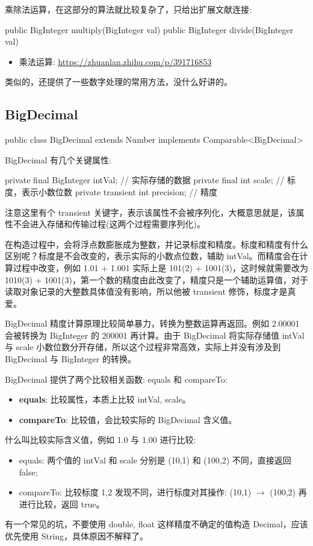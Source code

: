 乘除法运算，在这部分的算法就比较复杂了，只给出扩展文献连接:
\begin{Java}
public BigInteger multiply(BigInteger val)
public BigInteger divide(BigInteger val)
\end{Java}

\begin{itemize}
    \item 乘法运算: \url{https://zhuanlan.zhihu.com/p/391716853}
\end{itemize}

类似的，还提供了一些数字处理的常用方法，没什么好讲的。

\subsection{BigDecimal }

\begin{Java}
public class BigDecimal extends Number implements Comparable<BigDecimal>
\end{Java}

BigDecimal 有几个关键属性:

\begin{Java}
private final BigInteger intVal;    // 实际存储的数据
private final int scale;            // 标度，表示小数位数
private transient int precision;    // 精度
\end{Java}

注意这里有个 transient 关键字，表示该属性不会被序列化，大概意思就是，该属性不会进入存储和传输过程(这两个过程需要序列化)。

在构造过程中，会将浮点数膨胀成为整数，并记录标度和精度。标度和精度有什么区别呢？标度是不会改变的，表示实际的小数点位数，辅助 intVal。而精度会在计算过程中改变，例如 1.01 + 1.001 实际上是 101(2) + 1001(3)，这时候就需要改为 1010(3) + 1001(3)，第一个数的精度由此改变了，精度只是一个辅助运算值，对于读取对象记录的大整数具体值没有影响，所以他被 transient 修饰，标度才是真爱。

BigDecimal 精度计算原理比较简单暴力，转换为整数运算再返回。例如 2.00001 会被转换为 BigInteger 的 200001 再计算。由于 BigDecimal 将实际存储值 intVal 与 scale 小数位数分开存储，所以这个过程非常高效，实际上并没有涉及到 BigDecimal 与 BigInteger 的转换。

BigDecimal 提供了两个比较相关函数: equals 和 compareTo:
\begin{itemize}
    \item \textbf{equals}: 比较属性，本质上比较 intVal, scale。
    \item \textbf{compareTo}: 比较值，会比较实际的 BigDecimal 含义值。
\end{itemize}

什么叫比较实际含义值，例如 1.0 与 1.00 进行比较:
\begin{itemize}
    \item equals: 两个值的 intVal 和 scale 分别是 (10,1) 和 (100,2) 不同，直接返回 false;
    \item compareTo: 比较标度 1,2 发现不同，进行标度对其操作: (10,1) $\rightarrow$ (100,2) 再进行比较，返回 true。
\end{itemize}

有一个常见的坑，不要使用 double, float 这样精度不确定的值构造 Decimal，应该优先使用 String，具体原因不解释了。

\newpage